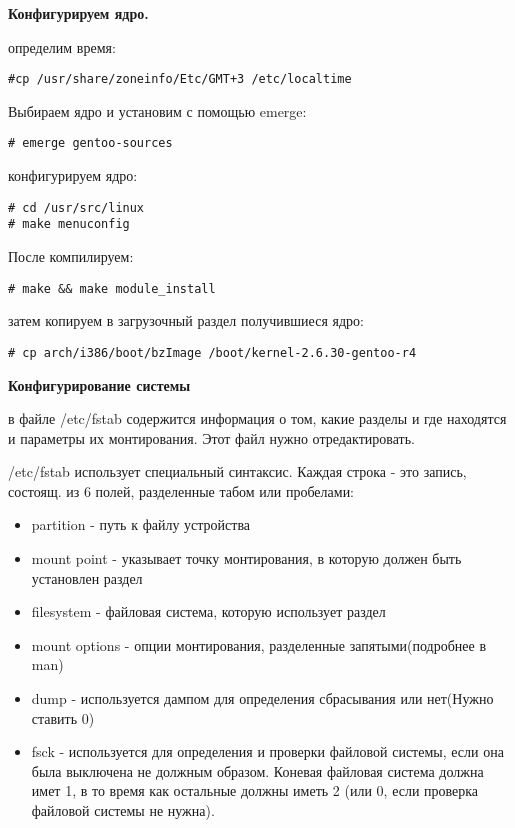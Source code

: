 \documentclass[12pt, a4paper]{article}
\begin{document}
{\bf Конфигурируем ядро.}

определим время:

\begin{verbatim}
#cp /usr/share/zoneinfo/Etc/GMT+3 /etc/localtime
\end{verbatim}

Выбираем ядро и установим с помощью emerge:

\begin{verbatim}
# emerge gentoo-sources
\end{verbatim}

конфигурируем ядро:

\begin{verbatim}
# cd /usr/src/linux
# make menuconfig
\end{verbatim}

После компилируем:

\begin{verbatim}
# make && make module_install
\end{verbatim}

затем копируем в загрузочный раздел получившиеся ядро:

\begin{verbatim}
# cp arch/i386/boot/bzImage /boot/kernel-2.6.30-gentoo-r4
\end{verbatim}

{\bf Конфигурирование системы}

в файле /etc/fstab  содержится информация о том, какие разделы и где находятся и параметры их монтирования. Этот файл нужно отредактировать.

/etc/fstab использует специальный синтаксис. Каждая строка - это запись, состоящ. из 6 полей, разделенные табом или пробелами:
\begin{itemize}
\item partition - путь к файлу устройства
\item mount point - указывает точку монтирования, в которую должен быть установлен раздел
\item filesystem - файловая система, которую использует раздел
\item mount options - опции монтирования, разделенные запятыми(подробнее в man)
\item dump - используется дампом для определения сбрасывания или нет(Нужно ставить 0)
\item fsck - используется для определения и проверки файловой системы, если она была выключена не должным образом. Коневая файловая система должна имет 1, в то время как остальные должны иметь 2 (или 0, если проверка файловой системы не нужна).
\end{itemize}
\end{document}
